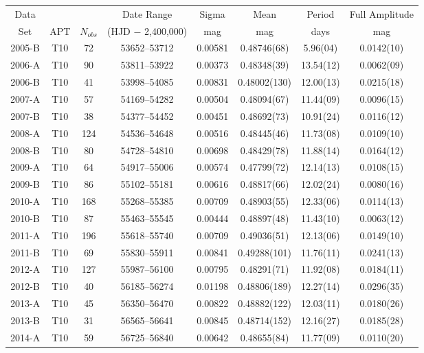 \documentclass[sn-standardnature]{sn-jnl}%
\begin{document}
\begin{table}
\begin{tabular}{@{}cccccccc@{}}
\toprule
Data & & & Date Range  & Sigma & Mean & Period & Full Amplitude\\
Set & APT & $N_{obs}$ & (HJD $-$ 2,400,000)  & mag & mag & days & mag\\
\midrule
   2005-B  & T10 &  72 & 53652--53712 & 0.00581 & 0.48746(68)  &  5.96(04) & 0.0142(10) \\
   2006-A  & T10 &  90 & 53811--53922 & 0.00373 & 0.48348(39)  & 13.54(12) & 0.0062(09) \\
   2006-B  & T10 &  41 & 53998--54085 & 0.00831 & 0.48002(130) & 12.00(13) & 0.0215(18) \\
   2007-A  & T10 &  57 & 54169--54282 & 0.00504 & 0.48094(67)  & 11.44(09) & 0.0096(15) \\
   2007-B  & T10 &  38 & 54377--54452 & 0.00451 & 0.48692(73)  & 10.91(24) & 0.0116(12) \\
   2008-A  & T10 & 124 & 54536--54648 & 0.00516 & 0.48445(46)  & 11.73(08) & 0.0109(10) \\
   2008-B  & T10 &  80 & 54728--54810 & 0.00698 & 0.48429(78)  & 11.88(14) & 0.0164(12) \\
   2009-A  & T10 &  64 & 54917--55006 & 0.00574 & 0.47799(72)  & 12.14(13) & 0.0108(15) \\
   2009-B  & T10 &  86 & 55102--55181 & 0.00616 & 0.48817(66)  & 12.02(24) & 0.0080(16) \\
   2010-A  & T10 & 168 & 55268--55385 & 0.00709 & 0.48903(55)  & 12.33(06) & 0.0114(13) \\
   2010-B  & T10 &  87 & 55463--55545 & 0.00444 & 0.48897(48)  & 11.43(10) & 0.0063(12) \\
   2011-A  & T10 & 196 & 55618--55740 & 0.00709 & 0.49036(51)  & 12.13(06) & 0.0149(10) \\
   2011-B  & T10 &  69 & 55830--55911 & 0.00841 & 0.49288(101) & 11.76(11) & 0.0241(13) \\
   2012-A  & T10 & 127 & 55987--56100 & 0.00795 & 0.48291(71)  & 11.92(08) & 0.0184(11) \\
   2012-B  & T10 &  40 & 56185--56274 & 0.01198 & 0.48806(189) & 12.27(14) & 0.0296(35) \\
   2013-A  & T10 &  45 & 56350--56470 & 0.00822 & 0.48882(122) & 12.03(11) & 0.0180(26) \\
   2013-B  & T10 &  31 & 56565--56641 & 0.00845 & 0.48714(152) & 12.16(27) & 0.0185(28) \\
   2014-A  & T10 &  59 & 56725--56840 & 0.00642 & 0.48655(84)  & 11.77(09) & 0.0110(20) \\

\end{tabular}
\end{table}
\end{document}
